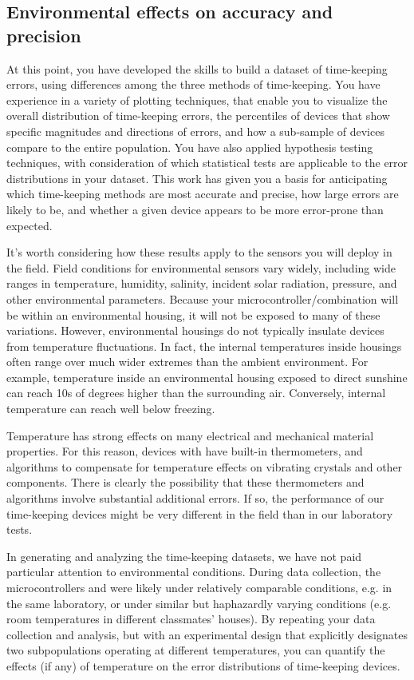 \subsection{Environmental effects on \rtc accuracy and precision}
At this point, you have developed the skills to build a dataset of time-keeping errors, using differences among the three methods of time-keeping. 
You have experience in a variety of plotting techniques, that enable you to visualize the overall distribution of time-keeping errors, the percentiles of devices that show specific magnitudes and directions of errors, and how a sub-sample of devices compare to the entire population. 
You have also applied hypothesis testing techniques, with consideration of which statistical tests are applicable to the error distributions in your dataset.
This work has given you a basis for anticipating which time-keeping methods are most accurate and precise, how large errors are likely to be, and whether a given device appears to be more error-prone than expected.

It's worth considering how these results apply to the sensors you will deploy in the field. 
Field conditions for environmental sensors vary widely, including wide ranges in temperature, humidity, salinity, incident solar radiation, pressure, and other environmental parameters. 
Because your microcontroller/\rtc combination will be within an environmental housing, it will not be exposed to many of these variations. 
However, environmental housings do not typically insulate devices from temperature fluctuations.
In fact, the internal temperatures inside housings often range over much wider extremes than the ambient environment.
For example, temperature inside an environmental housing exposed to direct sunshine can reach 10s of degrees higher than the surrounding air. 
Conversely, internal temperature can reach well below freezing.

Temperature has strong effects on many electrical and mechanical material properties. 
For this reason, devices with \rtcs have built-in thermometers, and algorithms to compensate for temperature effects on vibrating crystals and other components.
There is clearly the possibility that these thermometers and algorithms involve substantial additional errors.
If so, the performance of our time-keeping devices might be very different in the field than in our laboratory tests.

In generating and analyzing the time-keeping datasets, we have not paid particular attention to environmental conditions. 
During data collection, the microcontrollers and \rtcs were likely under relatively comparable conditions, e.g. in the same laboratory, or under similar but haphazardly varying conditions (e.g. room temperatures in different classmates' houses).
By repeating your data collection and analysis, but with an experimental design that explicitly designates two subpopulations operating at different temperatures, you can quantify the effects (if any) of temperature on the error distributions of time-keeping devices.

